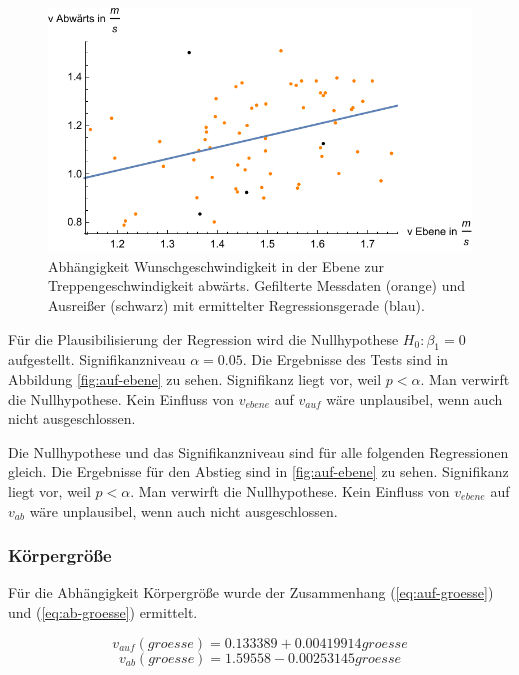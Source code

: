 \begin{figure} \centering 
	\includegraphics[]{abbildungen/regression/2017/ohneausreisser/ab-ebene.pdf}
	\caption{Abhängigkeit Wunschgeschwindigkeit in der Ebene zur Treppengeschwindigkeit abwärts. Gefilterte Messdaten (orange) und Ausreißer (schwarz) mit ermittelter Regressionsgerade (blau).
	\label{fig:ohne-ab-ebene}}
\end{figure}

Für die Plausibilisierung der Regression wird die Nullhypothese 
$H_0: \beta_1 = 0$ aufgestellt. Signifikanzniveau $\alpha = 0.05$.
Die Ergebnisse des Tests sind in Abbildung \ref{fig:auf-ebene} zu sehen.
Signifikanz liegt vor, weil $p < \alpha$. Man verwirft die
Nullhypothese. Kein Einfluss von $v_{ebene}$ auf $v_{auf}$ wäre unplausibel, wenn auch nicht ausgeschlossen.

Die Nullhypothese und das Signifikanzniveau sind für alle folgenden Regressionen gleich. Die Ergebnisse für den Abstieg sind in \ref{fig:auf-ebene} zu sehen.
Signifikanz liegt vor, weil $p < \alpha$. Man verwirft die
Nullhypothese. Kein Einfluss von $v_{ebene}$ auf $v_{ab}$ wäre unplausibel, wenn auch nicht ausgeschlossen.

\subsubsection{Körpergröße}

Für die Abhängigkeit Körpergröße wurde 
der Zusammenhang (\ref{eq:auf-groesse}) und (\ref{eq:ab-groesse}) ermittelt.

\begin{equation} \label{eq:auf-groesse}
	v_{auf}(groesse) = 0.133389 + 0.00419914 groesse
\end{equation}
\begin{equation} \label{eq:ab-groesse}
	v_{ab}(groesse) = 1.59558 - 0.00253145 groesse
\end{equation}

